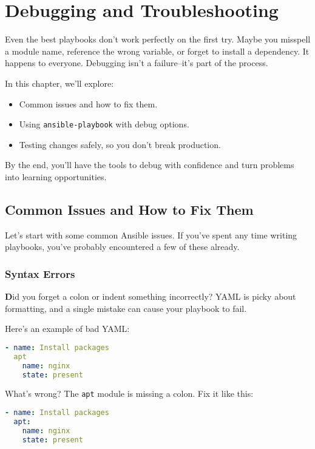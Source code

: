 \chapter{Debugging and Troubleshooting}

Even the best playbooks don't work perfectly on the first try. Maybe you misspell a module name, reference the wrong variable, or forget to install a dependency. It happens to everyone. Debugging isn't a failure--it's part of the process.

In this chapter, we'll explore:
\begin{itemize}
    \item Common issues and how to fix them.
    \item Using \texttt{ansible-playbook} with debug options.
    \item Testing changes safely, so you don't break production.
\end{itemize}

By the end, you'll have the tools to debug with confidence and turn problems into learning opportunities.


\section{Common Issues and How to Fix Them}

Let's start with some common Ansible issues. If you've spent any time writing playbooks, you've probably encountered a few of these already.

\subsection{Syntax Errors}

\textbf{D}id you forget a colon or indent something incorrectly? YAML is picky about formatting, and a single mistake can cause your playbook to fail.

Here's an example of bad YAML:
\begin{lstlisting}[language=yaml, caption=Bad YAML]
- name: Install packages
  apt
    name: nginx
    state: present
\end{lstlisting}

What's wrong? The \texttt{apt} module is missing a colon. Fix it like this:
\begin{lstlisting}[language=yaml, caption=Correct YAML]
- name: Install packages
  apt:
    name: nginx
    state: present
\end{lstlisting}


